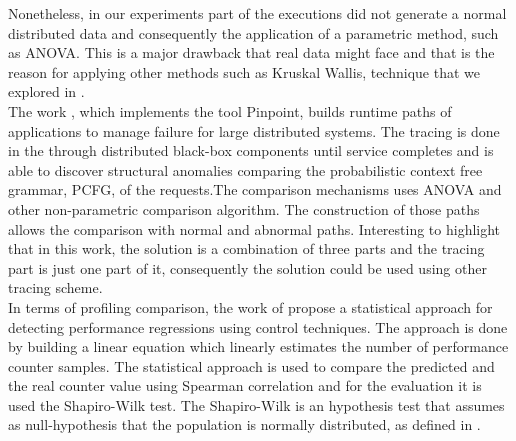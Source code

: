 Nonetheless, in our experiments part of the executions did not generate a normal distributed data and consequently the application of a parametric method, such as ANOVA. This is a major drawback that real data might face and that is the reason for applying other methods such as Kruskal Wallis, technique that we explored in \cite{KW}.\\
The work \cite{50}, which implements the tool Pinpoint, builds runtime paths of applications to manage failure for large distributed systems. The tracing is done in the through distributed black-box components until service completes and is able to discover structural anomalies comparing the probabilistic context free grammar, PCFG, of the requests.The comparison mechanisms uses ANOVA and other non-parametric comparison algorithm. The construction of those paths allows the comparison with normal and abnormal paths. Interesting to highlight that in this work, the solution is a combination of three parts and the tracing part is just one part of it, consequently the solution could be used using other tracing scheme.\\
In terms of profiling comparison, the work of \cite{process_control} propose a statistical approach for detecting performance regressions using control techniques. The approach is done by building a linear equation which linearly estimates the number of performance counter samples. The statistical approach is used to compare the predicted and the real counter value using Spearman correlation and for the evaluation it is used the Shapiro-Wilk test. The Shapiro-Wilk is an hypothesis test that assumes as null-hypothesis that the population is normally distributed, as defined in \cite{shapiro}.\\
